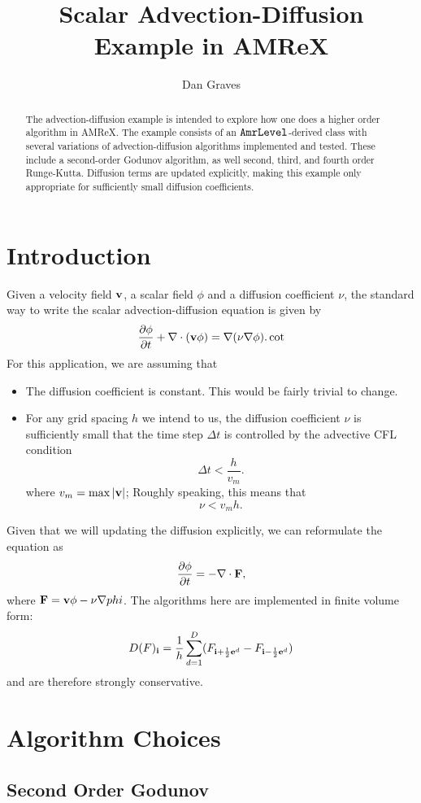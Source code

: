 \documentclass{article}
\title{Scalar Advection-Diffusion Example in AMReX}
\author{Dan Graves}
\newcommand{\ibold}{{\bf i}}
\newcommand{\ebold}{{\bf e}}
\newcommand{\vbold}{{\bf v}}
\newcommand{\Fbold}{{\bf F}}
\newcommand{\dt}{{\Delta t}}
\newcommand{\dx}{{h}}
\newcommand{\half}{\frac{1}{2}}
\newcommand{\iph}{{\ibold + \half \ebold^d}}
\newcommand{\imh}{{\ibold - \half \ebold^d}}
\begin{document}
\begin{abstract}
  The advection-diffusion example is intended to explore how one does
  a higher order algorithm in AMReX.    The example consists of an
  $\tt{AmrLevel}$-derived class with several variations of
  advection-diffusion algorithms implemented and tested.  These
  include a second-order Godunov algorithm, as well second, third, and
  fourth order Runge-Kutta.   Diffusion terms are updated explicitly,
  making this example only appropriate for sufficiently small
  diffusion coefficients.
\end{abstract}

\section{Introduction}

Given a velocity field $\vbold$, a scalar field  $\phi$ and a
diffusion coefficient $\nu$, the standard way to write the 
scalar advection-diffusion equation  is given by 
$$
\frac{\partial \phi}{\partial t} + \nabla \cdot (\vbold \phi) = \nabla
(\nu \nabla \phi).
\cot 
$$
For this application, we are assuming that 
\begin{itemize}
\item The diffusion coefficient is constant.  This would be fairly
  trivial to change.
\item For any grid spacing $\dx$ we intend to us, the diffusion
  coefficient $\nu$ is sufficiently small that the time
  step $\dt$ is controlled by the advective CFL condition
$$
\dt < \frac{\dx}{v_m}.
$$
where $v_m= \max|\vbold|$;
Roughly speaking, this means that 
$$
\nu < v_m \dx.
$$
\end{itemize}
Given that we will updating the diffusion explicitly, we can
reformulate the equation as 
$$
\frac{\partial \phi}{\partial t} =  -\nabla \cdot \Fbold, 
$$
where $\Fbold = \vbold \phi - \nu \nabla phi$.
The algorithms here are implemented in finite volume form:
$$
D(F)_\ibold = \frac{1}{\dx} \sum^D_{d = 1} (F_{\iph} - F_\imh)
$$
and are
therefore strongly conservative.

\section{Algorithm Choices}

\subsection{Second Order Godunov} 
\end{document}
